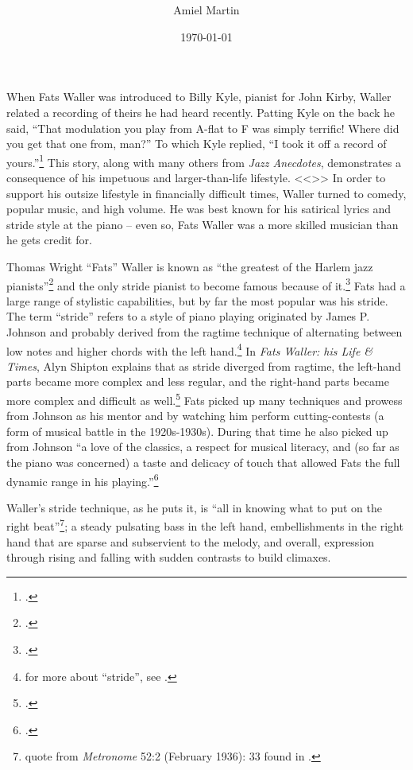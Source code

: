 \documentclass[11pt]{report}
\title{\fattitle \\
	\large \fatslogan}
\author{Amiel Martin}
\date{\today}
\begin{document}
	\maketitle

	\label{sec:introduction}
	When Fats Waller was introduced to Billy Kyle, pianist for John Kirby, Waller related a recording of theirs he had heard recently. Patting Kyle on the back he said, ``That modulation you play from A-flat to F was simply terrific! Where did you get that one from, man?'' To which Kyle replied, ``I took it off a record of yours.''\footnote{\cite[231]{anecdotes}.} This story, along with many others from \emph{Jazz Anecdotes}, demonstrates a consequence of his impetuous and larger-than-life lifestyle. <<>> In order to support his outsize lifestyle in financially difficult times, Waller turned to comedy, popular music, and high volume. He was best known for his satirical lyrics and stride style at the piano -- even so, Fats Waller was a more skilled musician than he gets credit for.

	\label{sec:piano_skills}
	Thomas Wright ``Fats'' Waller is known as ``the greatest of the Harlem jazz pianists''\footnote{\cite[2]{life}.} and the only stride pianist to become famous because of it.\footnote{\cite[146]{visions}.} Fats had a large range of stylistic capabilities, but by far the most popular was his stride. The term ``stride'' refers to a style of piano playing originated by James P. Johnson and probably derived from the ragtime technique of alternating between low notes and higher chords with the left hand.\footnote{for more about ``stride'', see \cite[79]{experience}.} In \emph{Fats Waller: his Life \& Times}, Alyn Shipton explains that as stride diverged from ragtime, the left-hand parts became more complex and less regular, and the right-hand parts became more complex and difficult as well.\footnote{\cite[5]{life}.} Fats picked up many techniques and prowess from Johnson as his mentor and by watching him perform cutting-contests (a form of musical battle in the 1920s-1930s). During that time he also picked up from Johnson ``a love of the classics, a respect for musical literacy, and (so far as the piano was concerned) a taste and delicacy of touch that allowed Fats the full dynamic range in his playing.''\footnote{\cite[8]{life}.}
	
	Waller's stride technique, as he puts it, is ``all in knowing what to put on the right beat''\footnote{quote from \emph{Metronome} 52:2 (February 1936): 33 found in \cite{transcriptions}.}; a steady pulsating bass in the left hand, embellishments in the right hand that are sparse and subservient to the melody, and overall, expression through rising and falling with sudden contrasts to build climaxes.
	
\end{document}
